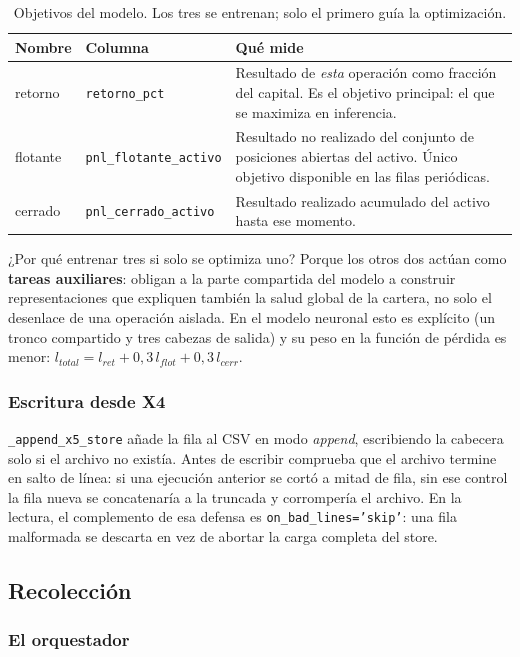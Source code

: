 \documentclass[11pt,a4paper]{article}
\newcommand{\code}[1]{\texttt{\small #1}}
\newcommand{\bigsep}{\par\vspace{3pt}}
\begin{document}
\begin{table}[h]
\centering
\small
\begin{tabularx}{\linewidth}{@{}l l X@{}}
\toprule
\textbf{Nombre} & \textbf{Columna} & \textbf{Qué mide} \\
\midrule
retorno & \code{retorno_pct} & Resultado de \textit{esta} operación como fracción del capital. Es el objetivo principal: el que se maximiza en inferencia. \\
flotante & \code{pnl_flotante_activo} & Resultado no realizado del conjunto de posiciones abiertas del activo. Único objetivo disponible en las filas periódicas. \\
cerrado & \code{pnl_cerrado_activo} & Resultado realizado acumulado del activo hasta ese momento. \\
\bottomrule
\end{tabularx}
\caption{Objetivos del modelo. Los tres se entrenan; solo el primero guía la optimización.}
\end{table}

\bigsep
¿Por qué entrenar tres si solo se optimiza uno? Porque los otros dos actúan como
\textbf{tareas auxiliares}: obligan a la parte compartida del modelo a construir
representaciones que expliquen también la salud global de la cartera, no solo el desenlace
de una operación aislada. En el modelo neuronal esto es explícito (un tronco compartido y
tres cabezas de salida) y su peso en la función de pérdida es menor: $l_{total} = l_{ret} +
0{,}3\, l_{flot} + 0{,}3\, l_{cerr}$.

\subsubsection{Escritura desde X4}

\code{_append_x5_store} añade la fila al CSV en modo \textit{append}, escribiendo la
cabecera solo si el archivo no existía. Antes de escribir comprueba que el archivo termine
en salto de línea: si una ejecución anterior se cortó a mitad de fila, sin ese control la
fila nueva se concatenaría a la truncada y corrompería el archivo. En la lectura, el
complemento de esa defensa es \code{on_bad_lines='skip'}: una fila malformada se descarta en
vez de abortar la carga completa del store.

\subsection{Recolección}

\subsubsection{El orquestador}
\end{document}
